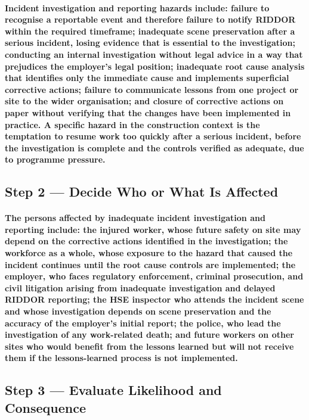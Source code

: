 {\paragraph{Incident investigation and reporting hazards include: failure to recognise a reportable event and therefore failure to notify RIDDOR within the required timeframe; inadequate scene preservation after a serious incident, losing evidence that is essential to the investigation; conducting an internal investigation without legal advice in a way that prejudices the employer's legal position; inadequate root cause analysis that identifies only the immediate cause and implements superficial corrective actions; failure to communicate lessons from one project or site to the wider organisation; and closure of corrective actions on paper without verifying that the changes have been implemented in practice. A specific hazard in the construction context is the temptation to resume work too quickly after a serious incident, before the investigation is complete and the controls verified as adequate, due to programme pressure.}

\subsection{Step 2 --- Decide Who or What Is Affected}
\paragraph{The persons affected by inadequate incident investigation and reporting include: the injured worker, whose future safety on site may depend on the corrective actions identified in the investigation; the workforce as a whole, whose exposure to the hazard that caused the incident continues until the root cause controls are implemented; the employer, who faces regulatory enforcement, criminal prosecution, and civil litigation arising from inadequate investigation and delayed RIDDOR reporting; the HSE inspector who attends the incident scene and whose investigation depends on scene preservation and the accuracy of the employer's initial report; the police, who lead the investigation of any work-related death; and future workers on other sites who would benefit from the lessons learned but will not receive them if the lessons-learned process is not implemented.}

\subsection{Step 3 --- Evaluate Likelihood and Consequence}
}
